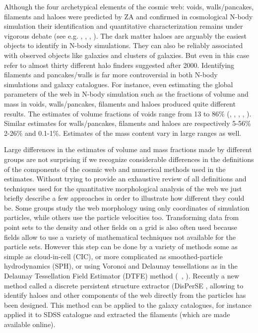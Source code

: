   
Although the four archetypical elements of the cosmic web:  voids, walls/pancakes, filaments and haloes 
were predicted by ZA and confirmed in cosmological N-body simulation their identification and quantitative characterization
remains under vigorous debate
(see e.g. \citealt{Colberg2008}, \citealt{Elahi2013}, \citealt{Knebe2013}, \citealt{Hoffmann2014}).
The dark matter haloes are arguably the easiest objects to identify in N-body simulations. They can also be reliably associated with
observed objects like galaxies and clusters of galaxies.  But even in this case \citet{Knebe2013} refer to almost thirty different
halo finders suggested after 2000. Identifying filaments and pancakes/walls is far more controversial in both N-body simulations 
and galaxy catalogues. For instance, even estimating the global parameters of the  web  in N-body simulation such as the fractions of volume and mass
in voids, walls/pancakes, filaments and haloes produced quite different results. The estimates of volume 
fractions of voids range from 13  to 86\%  (\citealt{Cautun2014a}, \citealt{Falck2015}, \citealt{Forero-Romero2009a} , \citealt{Hahn2007} , \citealt{Aragon-Calvo2010a}). Similar estimates for walls/pancakes, filaments 
and haloes  are respectively 5-56\% 2-26\% and 0.1-1\%.  Estimates of the mass content vary in large ranges as well.

Large differences in the estimates of volume and mass fractions made by different groups are not surprising if we recognize
considerable differences in the definitions of the components of the cosmic web and numerical methods used in the estimates. Without trying to provide an exhaustive review of all definitions and techniques used for the quantitative morphological 
analysis of the web  we just briefly describe a few approaches in order to illustrate how different they could be. 
Some groups study the web morphology using only coordinates of simulation particles, while others use the particle velocities too. 
Transforming data from  point sets to the density and other fields on a grid is also often used
because fields allow to use a variety of mathematical techniques not available for the particle sets.
However this step can be done by a variety of methods some as simple as cloud-in-cell (CIC), or more complicated as smoothed-particle hydrodynamics (SPH), 
or using Voronoi and Delaunay tessellations
as in the Delaunay Tessellation Field Estimator (DTFE) method (~\citealt{Weygaert2009}, \citealt{Cautun2014a}).  
Recently a new method called a discrete persistent structure extractor (DisPerSE \citealt{Sousbie2011f},  \citealt{Sousbie2011e} allowing to identify haloes and other components of the web directly from the particles 
has been designed.  This method can be applied to the galaxy catalogues, for instance \citet{Sousbie2011e} applied it to SDSS catalogue and extracted the filaments (which are made available online).

